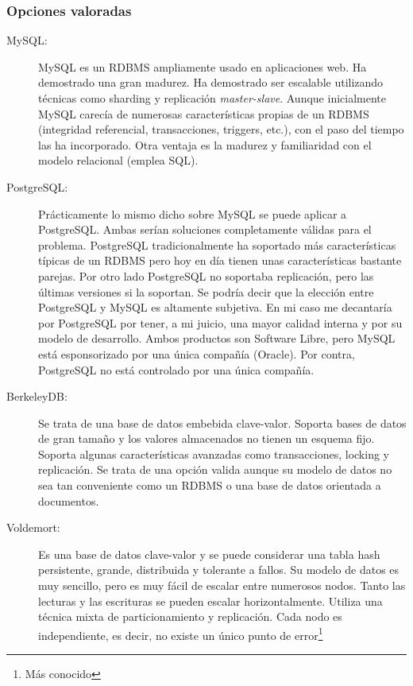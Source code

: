 \subsubsection{Opciones valoradas}
\begin{description}

\item[MySQL:] MySQL es un RDBMS ampliamente usado en aplicaciones
  web. Ha demostrado una gran madurez. Ha demostrado ser escalable
  utilizando técnicas como sharding\cite{SHARDING} y replicación
  \emph{master-slave}\cite{MASTER-SLAVE}. Aunque inicialmente MySQL
  carecía de numerosas características propias de un RDBMS (integridad
  referencial, transacciones, triggers, etc.), con el paso del tiempo
  las ha incorporado. Otra ventaja es la madurez y familiaridad con el
  modelo relacional (emplea SQL).
\item[PostgreSQL:] Prácticamente lo mismo dicho sobre MySQL se puede
  aplicar a PostgreSQL. Ambas serían soluciones completamente válidas
  para el problema. PostgreSQL tradicionalmente ha soportado más
  características típicas de un RDBMS pero hoy en día tienen unas
  características bastante parejas. Por otro lado PostgreSQL no
  soportaba replicación, pero las últimas versiones si la soportan. Se
  podría decir que la elección entre PostgreSQL y MySQL es altamente
  subjetiva. En mi caso me decantaría por PostgreSQL por tener, a mi
  juicio, una mayor calidad interna y por su modelo de
  desarrollo. Ambos productos son Software Libre, pero MySQL está
  esponsorizado por una única compañía (Oracle). Por contra,
  PostgreSQL no está controlado por una única compañía.
\item[BerkeleyDB:] Se trata de una base de datos embebida
  clave-valor. Soporta bases de datos de gran tamaño y los valores
  almacenados no tienen un esquema fijo. Soporta algunas
  características avanzadas como transacciones, locking y
  replicación. Se trata de una opción valida aunque su modelo de datos
  no sea tan conveniente como un RDBMS o una base de datos orientada a
  documentos.
\item[Voldemort:] Es una base de datos clave-valor y se puede
  considerar una tabla hash persistente, grande, distribuida y
  tolerante a fallos. Su modelo de datos es muy sencillo, pero es muy
  fácil de escalar entre numerosos nodos. Tanto las lecturas y las
  escrituras se pueden escalar horizontalmente. Utiliza una técnica
  mixta de particionamiento y replicación. Cada nodo es independiente,
  es decir, no existe un único punto de error\footnote{Más conocido
}
\end{description}
